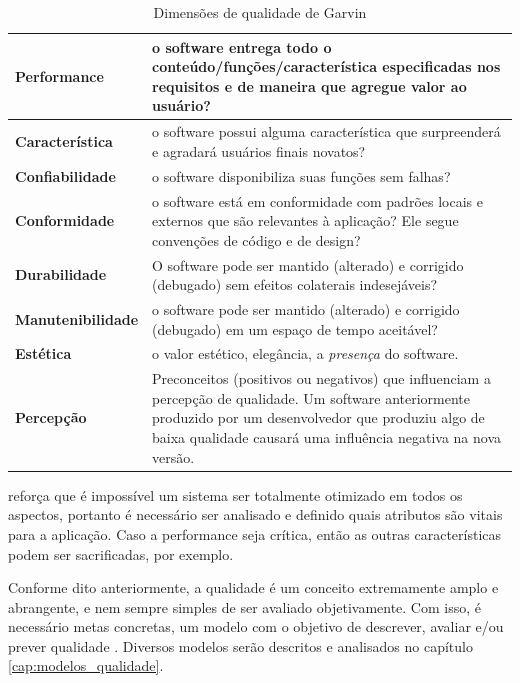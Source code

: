 \documentclass[
	12pt,				%
	openright,			%
	oneside,			%
	a4paper,			%
	english,			%
	brazil,				%
	]{abntex2}
\begin{document}
\begin{table}[h]
    \caption{Dimensões de qualidade de Garvin}
    \label{tab:qualidade_garvin}
    \begin{tabular}{p{3.7cm}|p{11cm}}
        \textbf{Performance} & o software entrega todo o conteúdo/funções/característica especificadas nos requisitos e de maneira que agregue valor ao usuário? \\ \hline
        \textbf{Característica} & o software possui alguma característica que surpreenderá e agradará usuários finais novatos? \\ \hline
        \textbf{Confiabilidade} & o software disponibiliza suas funções sem falhas? \\ \hline
        \textbf{Conformidade} & o software está em conformidade com padrões locais e externos que são relevantes à aplicação? Ele segue convenções de código e de design? \\ \hline
        \textbf{Durabilidade} & O software pode ser mantido (alterado) e corrigido (debugado) sem efeitos colaterais indesejáveis? \\ \hline
        \textbf{Manutenibilidade} & o software pode ser mantido (alterado) e corrigido (debugado) em um espaço de tempo aceitável? \\ \hline
        \textbf{Estética} & o valor estético, elegância, a \emph{presença} do software.\\ \hline
        \textbf{Percepção} & Preconceitos (positivos ou negativos) que influenciam a percepção de qualidade. Um software anteriormente produzido por um desenvolvedor que produziu algo de baixa qualidade causará uma influência negativa na nova versão.\\
  \end{tabular}
\end{table}

 reforça que é impossível um sistema ser totalmente otimizado em todos os aspectos, portanto é necessário ser analisado e definido quais atributos são vitais para a aplicação. Caso a performance seja crítica, então as outras características podem ser sacrificadas, por exemplo.

Conforme dito anteriormente, a qualidade é um conceito extremamente amplo e abrangente, e nem sempre simples de ser avaliado objetivamente. Com isso, é necessário metas concretas, um modelo com o objetivo de descrever, avaliar e/ou prever qualidade \cite{wagner2013}. Diversos modelos serão descritos e analisados no capítulo \ref{cap:modelos_qualidade}.
\end{document}
